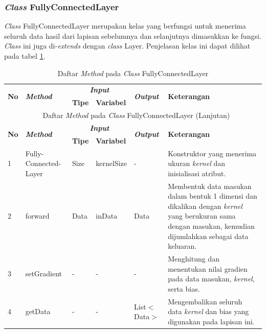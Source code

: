 \subsubsection{\textit{Class} FullyConnectedLayer}
\noindent \textit{Class} FullyConnectedLayer merupakan kelas yang berfungsi untuk menerima seluruh data hasil dari lapisan sebelumnya dan selanjutnya dimasukkan ke fungsi. \textit{Class} ini juga di-\textit{extends} dengan \textit{class} Layer. Penjelasan kelas ini dapat dilihat pada tabel \ref{tbl:classFullyConnectedLayer}.
\begingroup
\setlength{\LTleft}{-20cm plus -1fill}
\setlength{\LTright}{\LTleft}
\begin{small}
\begin{longtable}{|p{0.4cm}|p{2cm}|p{1.8cm}|p{1.8cm}|p{1.7cm}|p{3.55cm}|}
	\caption{Daftar \textit{Method} pada \textit{Class} FullyConnectedLayer \label{tbl:classFullyConnectedLayer}}\\
	\hline
	\multirow{2}{*}{\textbf{No}} & \multirow{2}{*}{\textit{\textbf{Method}}} & \multicolumn{2}{c|}{\textit{\textbf{Input}}} & \multirow{2}{*}{\textit{\textbf{Output}}} & 
	\multirow{2}{*}{\textbf{Keterangan}}\\
	\cline{3-4}
	& & \textbf{Tipe} & \textbf{Variabel} & & \\
	\endfirsthead
	\multicolumn{6}{c}{\textbf{\tablename~\thetable} Daftar \textit{Method} pada \textit{Class} FullyConnectedLayer (Lanjutan)} \\
	\hline
	\multirow{2}{*}{\textbf{No}} & \multirow{2}{*}{\textit{\textbf{Method}}} & \multicolumn{2}{c|}{\textit{\textbf{Input}}} & \multirow{2}{*}{\textit{\textbf{Output}}} & 
	\multirow{2}{*}{\textbf{Keterangan}}\\
	\cline{3-4}
	& & \textbf{Tipe} & \textbf{Variabel} & & \\
	\endhead
	\hline
	1 & Fully-\newline Connected-\newline Layer & Size & kernelSize & - & Konstruktor yang menerima ukuran \textit{kernel} dan inisialisasi atribut.\\
	\hline
	2 & forward & Data & inData & Data & Membentuk data masukan dalam bentuk 1 dimensi dan dikalikan dengan \textit{kernel} yang berukuran sama dengan masukan, kemudian dijumlahkan sebagai data keluaran.\\
	\hline
	3 & setGradient & - & - & - & Menghitung dan menentukan nilai gradien pada data masukan, \textit{kernel}, serta bias.\\
	\hline
	4 & getData & - & - & List$<$Data$>$ & Mengembalikan seluruh data \textit{kernel} dan bias yang digunakan pada lapisan ini.\\
	\hline
\end{longtable}
\end{small}
\endgroup

